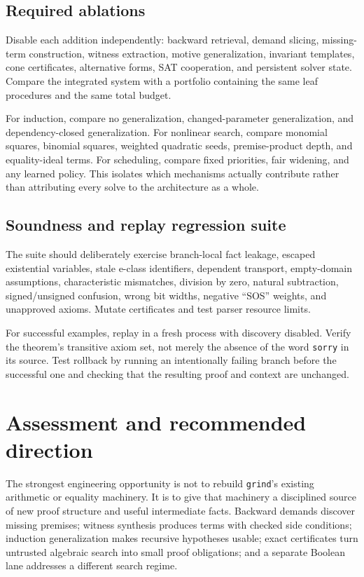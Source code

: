 \documentclass[11pt,a4paper]{article}
\newcommand{\grind}{\texttt{grind}}
\begin{document}
\subsection{Required ablations}

Disable each addition independently: backward retrieval, demand slicing, missing-term construction, witness extraction, motive generalization, invariant templates, cone certificates, alternative forms, SAT cooperation, and persistent solver state. Compare the integrated system with a portfolio containing the same leaf procedures and the same total budget.

For induction, compare no generalization, changed-parameter generalization, and dependency-closed generalization. For nonlinear search, compare monomial squares, binomial squares, weighted quadratic seeds, premise-product depth, and equality-ideal terms. For scheduling, compare fixed priorities, fair widening, and any learned policy. This isolates which mechanisms actually contribute rather than attributing every solve to the architecture as a whole.

\subsection{Soundness and replay regression suite}

The suite should deliberately exercise branch-local fact leakage, escaped existential variables, stale e-class identifiers, dependent transport, empty-domain assumptions, characteristic mismatches, division by zero, natural subtraction, signed/unsigned confusion, wrong bit widths, negative ``SOS'' weights, and unapproved axioms. Mutate certificates and test parser resource limits.

For successful examples, replay in a fresh process with discovery disabled. Verify the theorem's transitive axiom set, not merely the absence of the word \texttt{sorry} in its source. Test rollback by running an intentionally failing branch before the successful one and checking that the resulting proof and context are unchanged.

\section{Assessment and recommended direction}

The strongest engineering opportunity is not to rebuild \grind's existing arithmetic or equality machinery. It is to give that machinery a disciplined source of new proof structure and useful intermediate facts. Backward demands discover missing premises; witness synthesis produces terms with checked side conditions; induction generalization makes recursive hypotheses usable; exact certificates turn untrusted algebraic search into small proof obligations; and a separate Boolean lane addresses a different search regime.
\end{document}
